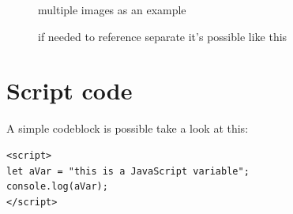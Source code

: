 \documentclass[10pt,a4paper]{article}
\begin{document}
\begin{figure}[H]
	\centering
	\caption{multiple images as an example}
	\caption{if needed to reference separate it's possible like this}
\end{figure}

\section{Script code}
A simple codeblock is possible take a look at this:
\begin{lstlisting}
<script>
let aVar = "this is a JavaScript variable";
console.log(aVar);
</script>
\end{lstlisting}
\end{document}
